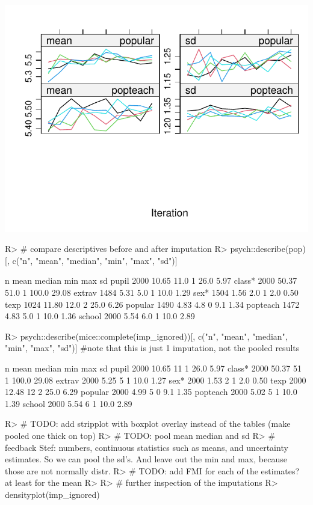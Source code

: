\documentclass[
]{jss}
\begin{document}
\begin{CodeChunk}
\begin{center}\includegraphics{Manuscript_files/figure-latex/pop-ignored-2} \end{center}

\begin{CodeInput}
R> # compare descriptives before and after imputation
R> psych::describe(pop)[, c("n", "mean", "median", "min", "max", "sd")]
\end{CodeInput}
\begin{CodeOutput}
            n  mean median min   max    sd
pupil    2000 10.65   11.0   1  26.0  5.97
class*   2000 50.37   51.0   1 100.0 29.08
extrav   1484  5.31    5.0   1  10.0  1.29
sex*     1504  1.56    2.0   1   2.0  0.50
texp     1024 11.80   12.0   2  25.0  6.26
popular  1490  4.83    4.8   0   9.1  1.34
popteach 1472  4.83    5.0   1  10.0  1.36
school   2000  5.54    6.0   1  10.0  2.89
\end{CodeOutput}
\begin{CodeInput}
R> psych::describe(mice::complete(imp_ignored))[, c("n", "mean", "median", "min", "max", "sd")] #note that this is just 1 imputation, not the pooled results
\end{CodeInput}
\begin{CodeOutput}
            n  mean median min   max    sd
pupil    2000 10.65     11   1  26.0  5.97
class*   2000 50.37     51   1 100.0 29.08
extrav   2000  5.25      5   1  10.0  1.27
sex*     2000  1.53      2   1   2.0  0.50
texp     2000 12.48     12   2  25.0  6.29
popular  2000  4.99      5   0   9.1  1.35
popteach 2000  5.02      5   1  10.0  1.39
school   2000  5.54      6   1  10.0  2.89
\end{CodeOutput}
\begin{CodeInput}
R> # TODO: add stripplot with boxplot overlay instead of the tables (make pooled one thick on top)
R> # TODO: pool mean median and sd
R> # feedback Stef: numbers, continuous statistics such as means, and uncertainty estimates. So we can pool the sd's. And leave out the min and max, because those are not normally distr.
R> # TODO: add FMI for each of the estimates? at least for the mean
R> 
R> # further inspection of the imputations
R> densityplot(imp_ignored)
\end{CodeInput}



\end{CodeChunk}
\end{document}
